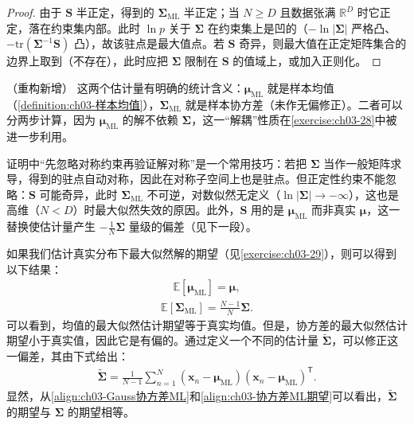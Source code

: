 \documentclass[../../main.tex]{subfiles}
\begin{document}
\begin{proof}
由于 $\boldsymbol{S}$ 半正定，得到的 $\boldsymbol{\Sigma}_{\mathrm{ML}}$ 半正定；当 $N\geqslant D$ 且数据张满 $\mathbb{R}^{D}$ 时它正定，落在约束集内部。此时 $\ln p$ 关于 $\boldsymbol{\Sigma}$ 在约束集上是凹的（$-\ln\lvert\boldsymbol{\Sigma}\rvert$ 严格凸、$-\mathrm{tr}(\boldsymbol{\Sigma}^{-1}\boldsymbol{S})$ 凸），故该驻点是最大值点。若 $\boldsymbol{S}$ 奇异，则最大值在正定矩阵集合的边界上取到（不存在），此时应把 $\boldsymbol{\Sigma}$ 限制在 $\boldsymbol{S}$ 的值域上，或加入正则化。
\end{proof}

\begin{remark}（重构新增）
这两个估计量有明确的统计含义：$\boldsymbol{\mu}_{\mathrm{ML}}$ 就是样本均值（\cref{definition:ch03-样本均值}），$\boldsymbol{\Sigma}_{\mathrm{ML}}$ 就是样本协方差（未作无偏修正）。二者可以分两步计算，因为 $\boldsymbol{\mu}_{\mathrm{ML}}$ 的解不依赖 $\boldsymbol{\Sigma}$，这一“解耦”性质在\cref{exercise:ch03-28}中被进一步利用。

证明中“先忽略对称约束再验证解对称”是一个常用技巧：若把 $\boldsymbol{\Sigma}$ 当作一般矩阵求导，得到的驻点自动对称，因此在对称子空间上也是驻点。但正定性约束不能忽略：$\boldsymbol{S}$ 可能奇异，此时 $\boldsymbol{\Sigma}_{\mathrm{ML}}$ 不可逆，对数似然无定义（$\ln\lvert\boldsymbol{\Sigma}\rvert\to-\infty$），这也是高维（$N<D$）时最大似然失效的原因。此外，$\boldsymbol{S}$ 用的是 $\boldsymbol{\mu}_{\mathrm{ML}}$ 而非真实 $\boldsymbol{\mu}$，这一替换使估计量产生 $-\frac{1}{N}\boldsymbol{\Sigma}$ 量级的偏差（见下一段）。
\end{remark}

如果我们估计真实分布下最大似然解的期望（见\cref{exercise:ch03-29}），则可以得到以下结果：
\begin{align}
\mathbb{E}[\boldsymbol{\mu}_{\mathrm{ML}}]=\boldsymbol{\mu},
\label{align:ch03-均值ML期望}
\end{align}
\begin{align}
\mathbb{E}[\boldsymbol{\Sigma}_{\mathrm{ML}}]=\frac{N-1}{N}\boldsymbol{\Sigma}.
\label{align:ch03-协方差ML期望}
\end{align}
可以看到，均值的最大似然估计期望等于真实均值。但是，协方差的最大似然估计期望小于真实值，因此它是有偏的。通过定义一个不同的估计量 $\tilde{\boldsymbol{\Sigma}}$，可以修正这一偏差，其由下式给出：
\begin{align}
\tilde{\boldsymbol{\Sigma}}=\frac{1}{N-1}\sum_{n=1}^{N}(\boldsymbol{x}_n-\boldsymbol{\mu}_{\mathrm{ML}})(\boldsymbol{x}_n-\boldsymbol{\mu}_{\mathrm{ML}})^{\mathsf{T}}.
\label{align:ch03-无偏协方差}
\end{align}
显然，从\eqref{align:ch03-Gauss协方差ML}和\eqref{align:ch03-协方差ML期望}可以看出，$\tilde{\boldsymbol{\Sigma}}$ 的期望与 $\boldsymbol{\Sigma}$ 的期望相等。
\end{document}
